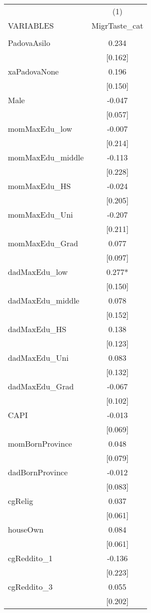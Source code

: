 \documentclass[]{article}
\begin{document}
\begin{tabular}{lc} \hline
 & (1) \\
VARIABLES & MigrTaste\_cat \\ \hline
 &  \\
PadovaAsilo & 0.234 \\
 & [0.162] \\
xaPadovaNone & 0.196 \\
 & [0.150] \\
Male & -0.047 \\
 & [0.057] \\
momMaxEdu\_low & -0.007 \\
 & [0.214] \\
momMaxEdu\_middle & -0.113 \\
 & [0.228] \\
momMaxEdu\_HS & -0.024 \\
 & [0.205] \\
momMaxEdu\_Uni & -0.207 \\
 & [0.211] \\
momMaxEdu\_Grad & 0.077 \\
 & [0.097] \\
dadMaxEdu\_low & 0.277* \\
 & [0.150] \\
dadMaxEdu\_middle & 0.078 \\
 & [0.152] \\
dadMaxEdu\_HS & 0.138 \\
 & [0.123] \\
dadMaxEdu\_Uni & 0.083 \\
 & [0.132] \\
dadMaxEdu\_Grad & -0.067 \\
 & [0.102] \\
CAPI & -0.013 \\
 & [0.069] \\
momBornProvince & 0.048 \\
 & [0.079] \\
dadBornProvince & -0.012 \\
 & [0.083] \\
cgRelig & 0.037 \\
 & [0.061] \\
houseOwn & 0.084 \\
 & [0.061] \\
cgReddito\_1 & -0.136 \\
 & [0.223] \\
cgReddito\_3 & 0.055 \\
 & [0.202] \\

\end{tabular}
\end{document}
